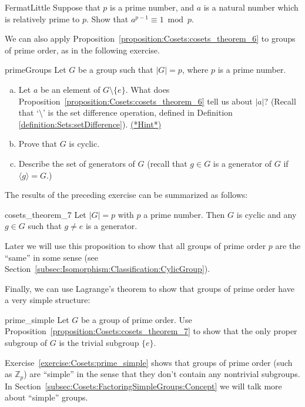 \begin{exercise}{FermatLittle}
Suppose that $p$ is a prime number, and $a$ is a natural number which is relatively prime to $p$. Show that  $a^{p-1} \equiv 1 \bmod{p}$.
\end{exercise}

We can also apply Proposition~\ref{proposition:Cosets:cosets_theorem_6} to groups of prime order, as in the following exercise.

\begin{exercise}{primeGroups}
Let $G$ be a group such that $|G| = p$, where $p$ is a prime number.
\begin{enumerate}[(a)]
\item
Let $a$ be an element of $G \setminus \{e\}$.  What does Proposition~\ref{proposition:Cosets:cosets_theorem_6} tell us about $|a|$? (Recall that `$\setminus$' is the set difference operation, defined in Definition \ref{definition:Sets:setDifference}).  \hyperref[sec:Cosets:Hints]{(*Hint*)}
\item
Prove that $G$ is cyclic.
\item
Describe the set of generators of $G$  (recall that $g \in G$ is a generator of $G$ if $\langle g \rangle = G$.)
\end{enumerate}
\end{exercise}

The results of the preceding exercise can be summarized as follows:

\begin{prop}{cosets_theorem_7}
Let $|G| = p$ with $p$ a prime number.  Then $G$ is cyclic and any $g \in G$ such that $g \neq e$ is a generator. 
\end{prop}
Later we will use this proposition to show that all groups of  prime order $p$  are the ``same'' in some sense (see Section~\ref{subsec:Isomorphism:Classification:CylicGroup}).

Finally, we can use Lagrange's theorem to show that groups of prime order have a very simple structure:
 
\begin{exercise}{prime_simple}
Let $G$ be a group of prime order. Use Proposition~\ref{proposition:Cosets:cosets_theorem_7} to show that the only proper subgroup of $G$ is the trivial subgroup $\{e\}$.
\end{exercise}

Exercise~\ref{exercise:Cosets:prime_simple} shows that groups of prime order (such as ${\mathbb Z}_p$)  are ``simple'' in the sense that they don't contain any nontrivial subgroups. In Section~\ref{subsec:Cosets:FactoringSimpleGroups:Concept} we will talk more about ``simple'' groups.


